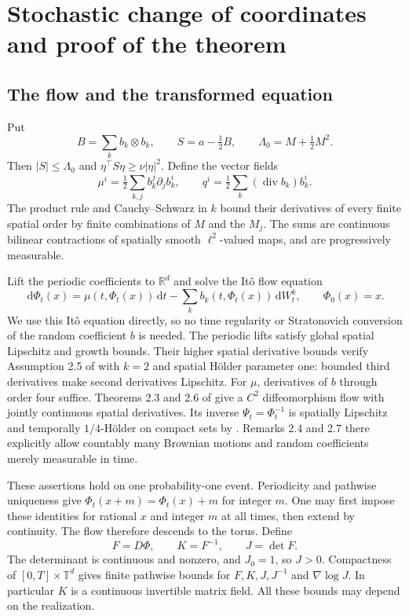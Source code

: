 \documentclass[11pt]{article}
\newcommand{\T}{\mathbb T}
\newcommand{\R}{\mathbb R}
\newcommand{\diver}{\operatorname{div}}
\newcommand{\dd}{\,\mathrm d}
\begin{document}
\section{Stochastic change of coordinates and proof of the theorem}

\subsection{The flow and the transformed equation}

Put
\begin{equation}\label{eq:BS}
 B=\sum_kb_k\otimes b_k,\qquad S=a-\tfrac12B,
 \qquad\Lambda_0=M+\tfrac12M^2.
\end{equation}
Then $|S|\le\Lambda_0$ and $\eta^\top S\eta\ge\nu|\eta|^2$.
Define the vector fields
\begin{equation}\label{eq:muq}
 \mu^i=\tfrac12\sum_{k,j}b_k^j\partial_jb_k^i,
 \qquad q^i=\tfrac12\sum_k(\diver b_k)b_k^i.
\end{equation}
The product rule and Cauchy--Schwarz in $k$ bound their derivatives of
every finite spatial order by finite combinations of $M$ and the $M_j$.
The sums are continuous bilinear contractions of spatially smooth
$\ell^2$-valued maps, and are progressively measurable.

Lift the periodic coefficients to $\R^d$ and solve the It\^o flow equation
\begin{equation}\label{eq:flow}
 \dd\Phi_t(x)=\mu(t,\Phi_t(x))\dd t
             -\sum_k b_k(t,\Phi_t(x))\dd W^k_t,
 \qquad\Phi_0(x)=x.
\end{equation}
We use this It\^o equation directly, so no time regularity or
Stratonovich conversion of the random coefficient $b$ is needed.
The periodic lifts satisfy global spatial Lipschitz and growth bounds.
Their higher spatial derivative bounds verify Assumption 2.5 of
\cite{ASV} with $k=2$ and spatial H\"older parameter one: bounded
third derivatives make second derivatives Lipschitz. For $\mu$,
derivatives of $b$ through order four suffice.
Theorems 2.3 and 2.6 of \cite{ASV} give a $C^2$ diffeomorphism flow
with jointly continuous spatial derivatives. Its inverse
$\Psi_t=\Phi_t^{-1}$ is spatially Lipschitz and temporally
$1/4$-H\"older on compact sets by \cite[Proposition 2.8]{ASV}.
Remarks 2.4 and 2.7 there explicitly allow countably many Brownian motions
and random coefficients merely measurable in time.

These assertions hold on one probability-one event. Periodicity and
pathwise uniqueness give $\Phi_t(x+m)=\Phi_t(x)+m$ for integer $m$.
One may first impose these identities for rational $x$ and integer $m$
at all times, then extend by continuity. The flow therefore descends to
the torus. Define
\begin{equation}\label{eq:FKJ}
 F=D\Phi,\qquad K=F^{-1},\qquad J=\det F.
\end{equation}
The determinant is continuous and nonzero, and $J_0=1$, so $J>0$.
Compactness of $[0,T]\times\T^d$ gives finite pathwise bounds for
$F,K,J,J^{-1}$ and $\nabla\log J$. In particular $K$ is a continuous
invertible matrix field. All these bounds may depend on the realization.
\end{document}
